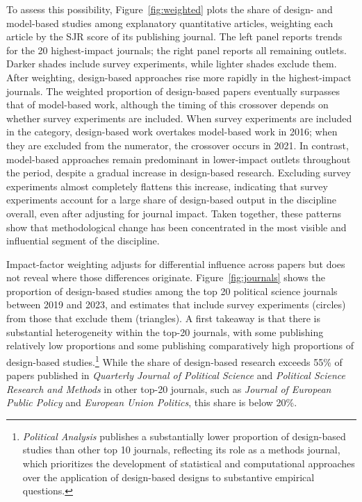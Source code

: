 \documentclass[12pt]{article}
\begin{document}
To assess this possibility, Figure~\ref{fig:weighted} plots the share of design- and model-based studies among explanatory quantitative articles, weighting each article by the SJR score of its publishing journal. The left panel reports trends for the 20 highest-impact journals; the right panel reports all remaining outlets. Darker shades include survey experiments, while lighter shades exclude them. After weighting, design-based approaches rise more rapidly in the highest-impact journals. The weighted proportion of design-based papers eventually surpasses that of model-based work, although the timing of this crossover depends on whether survey experiments are included. When survey experiments are included in the category, design-based work overtakes model-based work in 2016; when they are excluded from the numerator, the crossover occurs in 2021. In contrast, model-based approaches remain predominant in lower-impact outlets throughout the period, despite a gradual increase in design-based research. Excluding survey experiments almost completely flattens this increase, indicating that survey experiments account for a large share of design-based output in the discipline overall, even after adjusting for journal impact. Taken together, these patterns show that methodological change has been concentrated in the most visible and influential segment of the discipline. 

Impact-factor weighting adjusts for differential influence across papers but does not reveal where those differences originate. Figure~\ref{fig:journals} shows the proportion of design-based studies among the top 20 political science journals between 2019 and 2023, and estimates that include survey experiments (circles) from those that exclude them (triangles). A first takeaway is that there is substantial heterogeneity within the top-20 journals, with some publishing relatively low proportions and some publishing comparatively high proportions of design-based studies.\footnote{\emph{Political Analysis} publishes a substantially lower proportion of design-based studies than other top 10 journals, reflecting its role as a methods journal, which prioritizes the development of statistical and computational approaches over the application of design-based designs to substantive empirical questions.} While the share of design-based research exceeds 55\% of papers published in \emph{Quarterly Journal of Political Science} and \emph{Political Science Research and Methods} in other top-20 journals, such as {\it Journal of European Public Policy} and {\it European Union Politics}, this share is below 20\%. 
\end{document}
